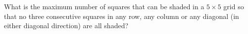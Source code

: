What is the maximum number of squares that can be shaded in a $5\times5$ grid so that no three consecutive squares in any row, any column or any diagonal (in either diagonal direction) are all shaded?
